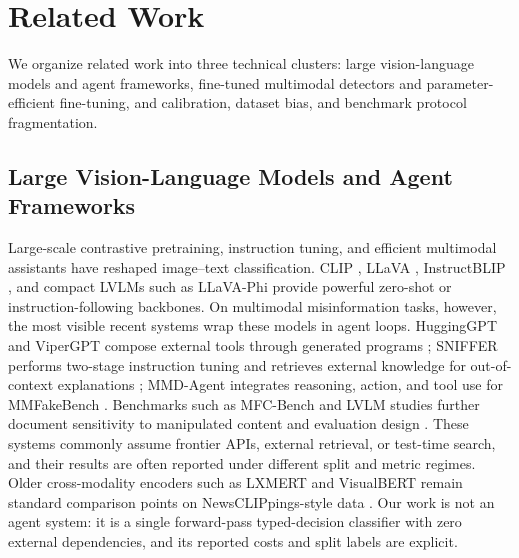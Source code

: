 \documentclass{article} %
\begin{document}
\section{Related Work}
\label{sec:related_work}
We organize related work into three technical clusters: large vision-language models and agent frameworks, fine-tuned multimodal detectors and parameter-efficient fine-tuning, and calibration, dataset bias, and benchmark protocol fragmentation.

\subsection{Large Vision-Language Models and Agent Frameworks}
Large-scale contrastive pretraining, instruction tuning, and efficient multimodal assistants have reshaped image--text classification. CLIP \citep{Radford2021LearningTransferable}, LLaVA \citep{Liu2023VisualInstruction}, InstructBLIP \citep{Dai2023InstructblipTowards}, and compact LVLMs such as LLaVA-Phi \citep{Zhu2024LlavaphiEfficient} provide powerful zero-shot or instruction-following backbones. On multimodal misinformation tasks, however, the most visible recent systems wrap these models in agent loops. HuggingGPT and ViperGPT compose external tools through generated programs \citep{Shen2023HugginggptSolving, Surs2023VipergptVisual}; SNIFFER performs two-stage instruction tuning and retrieves external knowledge for out-of-context explanations \citep{Qi2024SnifferMultimodal}; MMD-Agent integrates reasoning, action, and tool use for MMFakeBench \citep{Liu2024MmfakebenchMixedsource}. Benchmarks such as MFC-Bench and LVLM studies further document sensitivity to manipulated content and evaluation design \citep{Wang2024MfcbenchBenchmarking, Tahmasebi2024MultimodalMisinformation}. These systems commonly assume frontier APIs, external retrieval, or test-time search, and their results are often reported under different split and metric regimes. Older cross-modality encoders such as LXMERT and VisualBERT remain standard comparison points on NewsCLIPpings-style data \citep{Tan2019LxmertLearning, Li2019VisualbertSimple}. Our work is not an agent system: it is a single forward-pass typed-decision classifier with zero external dependencies, and its reported costs and split labels are explicit.
\end{document}
